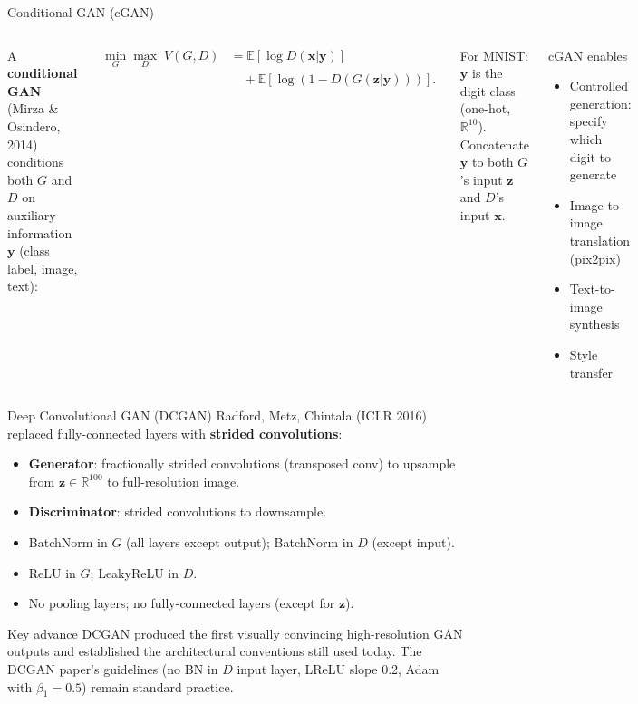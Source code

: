\documentclass[aspectratio=169,11pt]{beamer}
\newcommand{\E}{\mathbb{E}}
\newcommand{\R}{\mathbb{R}}
\newcommand{\bx}{\bm{x}}
\newcommand{\bz}{\bm{z}}
\begin{document}
\begin{frame}{Conditional GAN (cGAN)}
  \begin{columns}[T]
      A \textbf{conditional GAN} (Mirza \& Osindero, 2014) conditions both
      $G$ and $D$ on auxiliary information $\mathbf{y}$ (class label, image, text):

      \begin{align*}
        \min_G\max_D\;V(G,D)
        &= \E[\log D(\bx|\mathbf{y})]\\
        &\quad+ \E[\log(1-D(G(\bz|\mathbf{y})))].
      \end{align*}

      For MNIST: $\mathbf{y}$ is the digit class (one-hot, $\R^{10}$).
      Concatenate $\mathbf{y}$ to both $G$'s input $\bz$ and $D$'s input $\bx$.

      \begin{block}{cGAN enables}
        \begin{itemize}
          \item Controlled generation: specify which digit to generate
          \item Image-to-image translation (pix2pix)
          \item Text-to-image synthesis
          \item Style transfer
        \end{itemize}
      \end{block}
  \end{columns}
\end{frame}

\begin{frame}{Deep Convolutional GAN (DCGAN)}
  Radford, Metz, Chintala (ICLR 2016) replaced fully-connected layers
  with \textbf{strided convolutions}:

  \medskip
  \begin{itemize}
    \item \textbf{Generator}: fractionally strided convolutions (transposed conv)
          to upsample from $\bz\in\R^{100}$ to full-resolution image.
    \item \textbf{Discriminator}: strided convolutions to downsample.
    \item BatchNorm in $G$ (all layers except output); BatchNorm in $D$ (except input).
    \item ReLU in $G$; LeakyReLU in $D$.
    \item No pooling layers; no fully-connected layers (except for $\bz$).
  \end{itemize}

  \medskip
  \begin{alertblock}{Key advance}
    DCGAN produced the first visually convincing high-resolution GAN outputs
    and established the architectural conventions still used today.
    The DCGAN paper's guidelines (no BN in $D$ input layer, LReLU slope 0.2,
    Adam with $\beta_1=0.5$) remain standard practice.
  \end{alertblock}
\end{frame}
\end{document}
